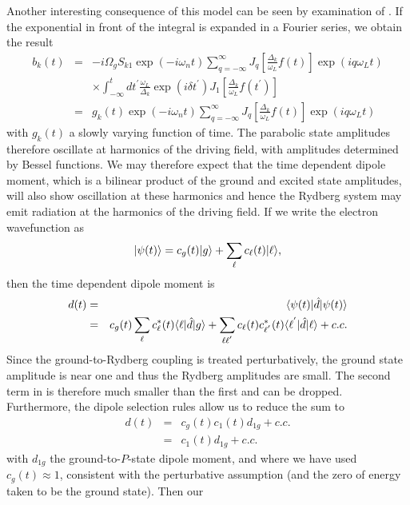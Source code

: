 Another interesting consequence of this model can be seen by examination of
.  If the exponential in front of the integral is expanded in a
Fourier series, we obtain the result
\begin{eqnarray}
b_k(t) &=& -i \Omega_g S_{k1} \exp(-i \omega_n t) \sum_{q= -\infty}^{\infty}
J_q\left[\frac{\Delta_k}{\omega_L} f(t)\right] \exp(iq\omega_L t)
\nonumber \\
&& \times \int_{-\infty}^{t} dt^{'} \frac{\omega_L}{\Delta_k}
\exp \left(i \delta t^{'}\right) J_{1} \left[\frac{\Delta_k}{\omega_L}
f\left(t^{'}\right)
\right] \nonumber \\
& =& g_k(t) \exp(-i \omega_n t) \sum_{q=-\infty}^{\infty}
J_q\left[\frac{\Delta_k}{\omega_L} f(t)\right] \exp(iq\omega_L t)
\end{eqnarray}
with $g_k(t)$ a slowly varying function of time.
The parabolic state amplitudes therefore oscillate at harmonics of the driving
field, with amplitudes determined by Bessel functions.  We may therefore expect
that the time dependent dipole moment, which is a bilinear product of the ground
and excited state amplitudes, will also show oscillation at these harmonics and
hence the Rydberg system may emit radiation at the harmonics of the driving
field.  If we write the electron wavefunction as
\begin{equation}
\vert \psi(t) \rangle = c_g(t)\vert g \rangle + \sum_{\ell}c_{\ell}(t)\vert \ell \rangle,
\end{equation}
then the time dependent dipole moment is
\begin{eqnarray}
d(t) &=& \langle \psi(t) \vert\hat{d}\vert \psi(t) \rangle \nonumber \\
&=& c_g(t) \sum_{\ell}c_{\ell}^{*}(t)\langle \ell \vert\hat{d}\vert g \rangle + \sum_{\ell
\ell^{'}} c_{\ell}(t)c_{\ell^{'}}^{*}(t) \langle \ell^{'} \vert\hat{d}\vert \ell \rangle
+ c.c.
\label{dipole}
\end{eqnarray}
Since the ground-to-Rydberg coupling is treated perturbatively, the ground
state amplitude is near one and thus the Rydberg amplitudes are small.  The
second term in  is therefore much smaller than the first and can be
dropped. Furthermore, the dipole selection rules allow us to reduce the sum to
\begin{eqnarray}
d(t) &=& c_g(t) c_1(t)d_{1g} + c.c. \nonumber \\
&=& c_1(t)d_{1g} + c.c.
\end{eqnarray}
with $d_{1g}$ the ground-to-$P$-state dipole moment, and
where we have used $c_g(t) \approx 1$, consistent with the perturbative
assumption (and the zero of energy taken to be the ground state).  Then our
